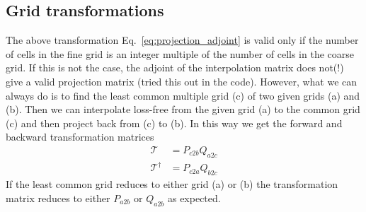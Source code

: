 \subsection{Grid transformations}
The above transformation Eq.~\eqref{eq:projection_adjoint} is
valid only if the number of cells in the fine grid is an integer multiple of the number of cells in the coarse grid. 
If this is not the case, the adjoint of the interpolation matrix
does not(!) give a valid projection matrix (tried this 
out in the code).
However, what we can always do is to find the least common multiple grid (c) of two given grids (a) and (b). Then
we can interpolate loss-free from the given grid (a) to the 
common grid (c) and then project back from (c) to (b).
In this way we get the forward and backward transformation matrices
\begin{align}
    \mathcal T &= P_{c2b}Q_{a2c}\\
    \mathcal T^\dagger &= P_{c2a} Q_{b2c}
    \label{}
\end{align}
If the least common grid reduces to either grid (a) or (b) the
transformation matrix reduces to either $P_{a2b}$ or $Q_{a2b}$ as expected.




